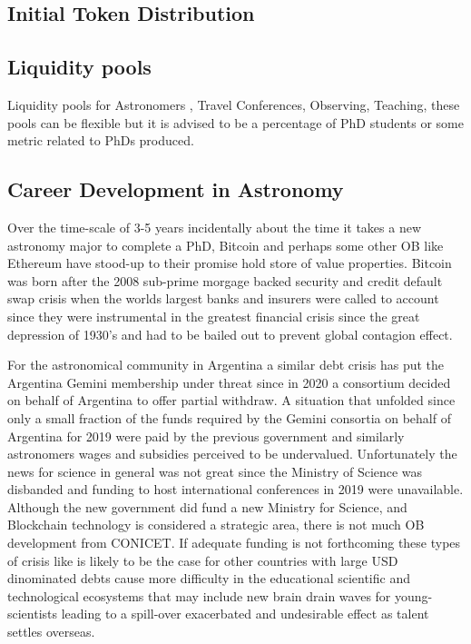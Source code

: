 \documentclass[final,5p,times,twocolumn,authoryear]{elsarticle}
\begin{document}
\subsection{Initial Token Distribution}

\subsection{Liquidity pools}

Liquidity pools for Astronomers , Travel Conferences, Observing, Teaching, these pools can be flexible but it is advised to be a percentage of PhD  students or some metric related to PhDs produced. 

\subsection{Career Development in Astronomy}

Over the time-scale of 3-5 years incidentally about the time it takes a new astronomy major to complete a PhD, Bitcoin and perhaps some other OB like Ethereum have stood-up to their promise hold store of value properties. Bitcoin was born after the 2008 sub-prime morgage backed security and credit default swap crisis when the worlds largest banks and insurers were called to account since they were instrumental in the greatest financial crisis since the great depression of 1930's and had to be bailed out to prevent global contagion effect.
 
For the astronomical community in Argentina a similar debt crisis has put the Argentina Gemini membership under threat since in 2020 a consortium decided on behalf of Argentina to offer partial withdraw. A situation that unfolded since only a small fraction of the funds required by the Gemini consortia on behalf of Argentina for 2019 were paid by the previous government and similarly astronomers wages and subsidies perceived to be undervalued. Unfortunately the news for science in general was not great since the Ministry of Science was disbanded and funding to host international conferences in 2019 were unavailable. Although the new government did fund a new Ministry for Science, and Blockchain technology is considered a strategic area, there is not much OB development from CONICET. If adequate funding is not forthcoming these types of crisis like is likely to be the case for other countries with large USD dinominated debts cause more difficulty in the educational scientific and technological ecosystems that may include new brain drain waves for young-scientists leading to a spill-over exacerbated and undesirable effect as talent settles overseas. 
\end{document}

